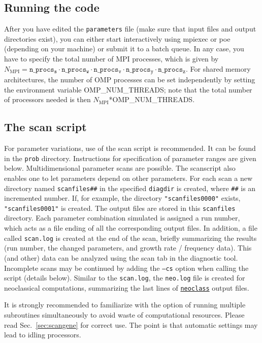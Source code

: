 \documentclass[12pt]{article}
\begin{document}
\subsection{Running the code}
After you have edited the \texttt{parameters} file (make sure that
input files and output directories exist), you can either start
\gene interactively using mpiexec or poe (depending on your
machine) or submit it to a batch queue. In any case, you have to
specify the total number of MPI processes, which is given by
$N_\mathrm{MPI}=\mathtt{n\_procs_s}\cdot
\mathtt{n\_procs_w}\cdot\mathtt{n\_procs_v}\cdot\mathtt{n\_procs_y}\cdot\mathtt{n\_procs_z}$.
For shared memory architectures, the number of OMP processes can
be set independently by setting the environment variable
OMP\_NUM\_THREADS; note that the total number of processors needed
is then $N_\mathrm{MPI}$*OMP\_NUM\_THREADS.


\subsection{The scan script}\label{sec:scanscript}
For \gene parameter variations, use of the scan script is recommended. It can be found
in the \texttt{prob} directory.
Instructions for specification of parameter ranges are given below.
Multidimensional parameter scans are possible.
The scanscript also enables one to let parameters depend on other parameters.
For each scan a new directory named \texttt{scanfiles\#\#} in the specified
\texttt{diagdir} is created, where \texttt{\#\#} is an incremented number. If, for
example, the directory \texttt{"scanfiles0000"} exists,
\texttt{"scanfiles0001"} is created.
The output files are stored in this \texttt{scanfiles} directory. Each
parameter combination simulated is assigned a run number, which acts as a
file ending of all the corresponding output files. 
In addition, a file called \texttt{scan.log} is created at the end of
the scan, briefly summarizing the results (run number, the changed parameters, and growth rate /
frequency data). 
This (and other) data can be analyzed using the scan tab in the diagnostic tool. 
Incomplete scans may be continued by adding the \texttt{--cs} option when calling the
script (details below).
Similar to the \texttt{scan.log}, the \texttt{neo.log} file is created for neoclassical
computations, summarizing the last lines of
\hyperlink{neoclass-file}{\texttt{neoclass}} output files.

It is strongly recommended to familiarize with the \gene option of running multiple \gene
subroutines simultaneously to avoid waste of computational resources. Please read Sec.~\ref{sec:scangene} for correct use. The point is that automatic settings may lead to idling processors.
\end{document}

